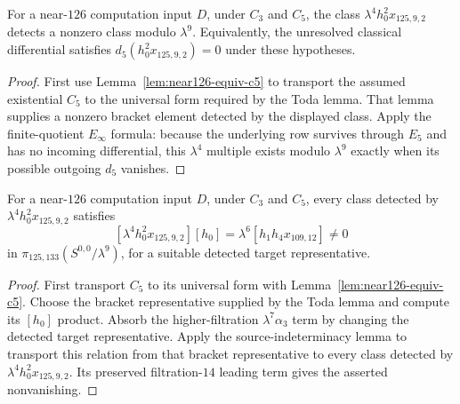 \begin{corollary}
  \label{cor:h02x1259-d5-zero}
  \notready
  For a near-$126$ computation input $D$, under $C_3$ and $C_5$, the class
  $\lambda^4h_0^2x_{125,9,2}$ detects a nonzero class modulo $\lambda^9$.
  Equivalently, the unresolved classical differential satisfies
  $d_5(h_0^2x_{125,9,2})=0$ under these hypotheses.
\end{corollary}

\begin{proof}
  First use Lemma~\ref{lem:near126-equiv-c5} to transport the assumed
  existential $C_5$ to the universal form required by the Toda lemma.  That
  lemma supplies a nonzero bracket element detected by the displayed
  class.  Apply the finite-quotient $E_\infty$ formula: because the underlying
  row survives through $E_5$ and has no incoming differential, this
  $\lambda^4$ multiple exists modulo $\lambda^9$ exactly when its possible
  outgoing $d_5$ vanishes.
\end{proof}

\begin{corollary}
  \label{cor:near126-two-extension}
  \notready
  For a near-$126$ computation input $D$, under $C_3$ and $C_5$, every class
  detected by
  $\lambda^4h_0^2x_{125,9,2}$ satisfies
  \[
    [\lambda^4h_0^2x_{125,9,2}][h_0]
      =\lambda^6[h_1h_4x_{109,12}]\ne0
  \]
  in $\pi_{125,133}(S^{0,0}/\lambda^9)$, for a suitable detected target
  representative.
\end{corollary}

\begin{proof}
  First transport $C_5$ to its universal form with
  Lemma~\ref{lem:near126-equiv-c5}.  Choose the bracket representative supplied
  by the Toda lemma and compute its
  $[h_0]$ product.  Absorb the higher-filtration $\lambda^7\alpha_3$ term by
  changing the detected target representative.  Apply the source-indeterminacy
  lemma to transport this relation from that bracket representative to every
  class detected by $\lambda^4h_0^2x_{125,9,2}$.  Its preserved
  filtration-$14$ leading term gives the asserted nonvanishing.
\end{proof}

